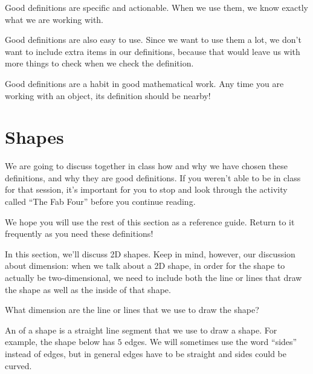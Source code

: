 \documentclass{ximera}
\begin{document}
Good definitions are specific and actionable. When we use them, we know exactly what we are working with.

Good definitions are also easy to use. Since we want to use them a lot, we don't want to include extra items in our definitions, because that would leave us with more things to check when we check the definition.

Good definitions are a habit in good mathematical work. Any time you are working with an object, its definition should be nearby!



\section{Shapes}
We are going to discuss together in class how and why we have chosen these definitions, and why they are good definitions. If you weren't able to be in class for that session, it's important for you to stop and look through the activity called ``The Fab Four'' before you continue reading.

We hope you will use the rest of this section as a reference guide. Return to it frequently as you need these definitions!

In this section, we'll discuss 2D shapes. Keep in mind, however, our discussion about dimension: when we talk about a 2D shape, in order for the shape to actually be two-dimensional, we need to include both the line or lines that draw the shape as well as the inside of that shape. 
\begin{question}
What dimension are the line or lines that we use to draw the shape?
\begin{multipleChoice}
\end{multipleChoice}
\end{question}

\begin{definition}
	An  of a shape is a straight line segment that we use to draw a shape. For example, the shape below has $5$ edges. We will sometimes use the word ``sides'' instead of edges, but in general edges have to be straight and sides could be curved.  
	\begin{image}
	\end{image}
\end{definition}
\end{document}
